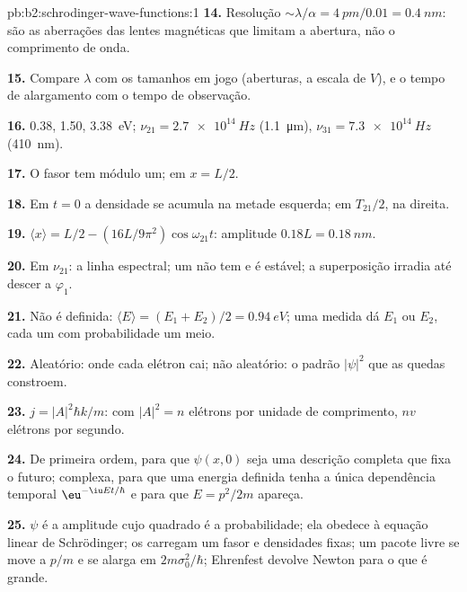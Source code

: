 \begin{solution}{pb:b2:schrodinger-wave-functions:1}
\textbf{14.} Resolução $\sim\lambda/\alpha = \qty{4}{pm}/0.01 = \qty{0.4}{nm}$: são as
aberrações das lentes magnéticas que limitam a abertura, não o comprimento de onda.

\textbf{15.} Compare $\lambda$ com os tamanhos em jogo (aberturas, a
escala de $V$), e o tempo de alargamento com o tempo de observação.

\textbf{16.} \qty{0.38}{}, \qty{1.50}{}, \qty{3.38}{eV}; $\nu_{21} = \qty{2.7e14}{Hz}$
(\qty{1.1}{\micro m}), $\nu_{31} = \qty{7.3e14}{Hz}$ (\qty{410}{nm}).

\textbf{17.} O fasor tem módulo um; em $x = L/2$.

\textbf{18.} Em $t = 0$ a densidade se acumula na metade esquerda; em
$T_{21}/2$, na direita.

\textbf{19.} $\langle x\rangle = L/2 - (16L/9\pi^2)\cos\omega_{21}t$: amplitude
$0.18L = \qty{0.18}{nm}$.

\textbf{20.} Em $\nu_{21}$: a linha espectral; um  não tem
 e é estável; a superposição irradia até
descer a $\varphi_1$.

\textbf{21.} Não é definida: $\langle E\rangle = (E_1 + E_2)/2 = \qty{0.94}{eV}$; uma
medida dá $E_1$ ou $E_2$, cada um com probabilidade um meio.

\textbf{22.} Aleatório: onde cada elétron cai; não aleatório: o
padrão $|\psi|^2$ que as quedas constroem.

\textbf{23.} $j = |A|^2\hbar k/m$: com $|A|^2 = n$ elétrons por unidade de comprimento,
$nv$ elétrons por segundo.

\textbf{24.} De primeira ordem, para que $\psi(x,0)$ seja uma descrição completa
que fixa o futuro; complexa, para que uma energia definida tenha a
única dependência temporal $\eu^{-\iu Et/\hbar}$ e para que $E = p^2/2m$ apareça.

\textbf{25.} $\psi$ é a amplitude cujo quadrado é a probabilidade; ela
obedece à equação linear de Schrödinger; os  carregam um
fasor e densidades fixas; um pacote livre se move a $p/m$ e se alarga
em $2m\sigma_0^2/\hbar$; Ehrenfest devolve Newton para o que é grande.
\end{solution}
